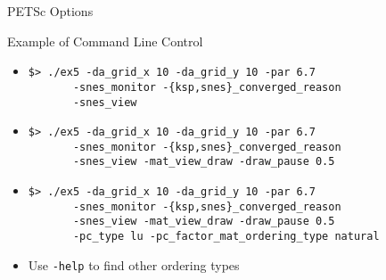 \begin{frame}[fragile]{PETSc Options}

\begin{block}{Example of Command Line Control}
  \begin{itemize}
  \item \lstinline|$> ./ex5 -da_grid_x 10 -da_grid_y 10 -par 6.7| \\
      \lstinline|       -snes_monitor -{ksp,snes}_converged_reason| \\
      \lstinline|       -snes_view|
  \item \lstinline|$> ./ex5 -da_grid_x 10 -da_grid_y 10 -par 6.7| \\
      \lstinline|       -snes_monitor -{ksp,snes}_converged_reason| \\
      \lstinline|       -snes_view -mat_view_draw -draw_pause 0.5|
  \item \lstinline|$> ./ex5 -da_grid_x 10 -da_grid_y 10 -par 6.7| \\
      \lstinline|       -snes_monitor -{ksp,snes}_converged_reason| \\
      \lstinline|       -snes_view -mat_view_draw -draw_pause 0.5| \\
      \lstinline|       -pc_type lu -pc_factor_mat_ordering_type natural|
  \item Use \lstinline|-help| to find other ordering types
\end{itemize}
\end{block}
\end{frame}
